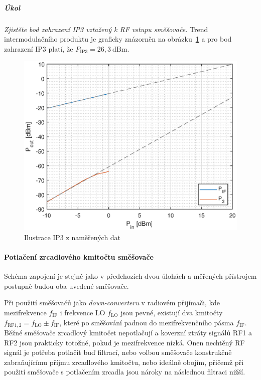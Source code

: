 \documentclass[11pt,a4paper]{article}
\begin{document}
\subparagraph*{Úkol} \emph{Zjistěte bod zahrazení IP3 vztažený k RF vstupu směšovače.} Trend intermodulačního produktu je graficky znázorněn na obrázku~\ref{fig:task2-ip3} a pro bod zahrazení IP3 platí, že $P_{\mathrm{IP3}} = 26,3~\mathrm{dBm}$.
\begin{figure}[!ht]
    \centering
    \includegraphics[width=.6\textwidth]{src/task2-ip3.eps}
    \caption{Ilustrace IP3 z naměřených dat}
    \label{fig:task2-ip3}
\end{figure}

\paragraph*{Potlačení zrcadlového kmitočtu směšovače} Schéma zapojení je stejné jako v předchozích dvou úlohách a měřených přístrojem postupně budou oba uvedené směšovače.

Při použití směšovačů jako \emph{down-converteru} v radiovém přijímači, kde mezifrekvence $f_{\mathrm{IF}}$ i frekvence LO $f_{\mathrm{LO}}$ jsou pevné, existují dva kmitočty $f_{\mathrm{RF1,2}} = f_{\mathrm{LO}}\pm f_{\mathrm{IF}}$, které po směšování padnou do mezifrekvenčního pásma $f_{\mathrm{IF}}$. Běžné směšovače zrcadlový kmitočet nepotlačují a koverzní ztráty signálů RF1 a RF2 jsou prakticky totožné, pokud je mezifrekvence nízká. Onen nechtěný RF signál je potřeba potlačit buď filtrací, nebo volbou směšovače konstrukčně zabraňujícímu příjmu zrcadlového kmitočtu, nebo ideálně obojím, přičemž při použití směšovače s potlačením zrcadla jsou nároky na následnou filtraci nižší.
\end{document}
